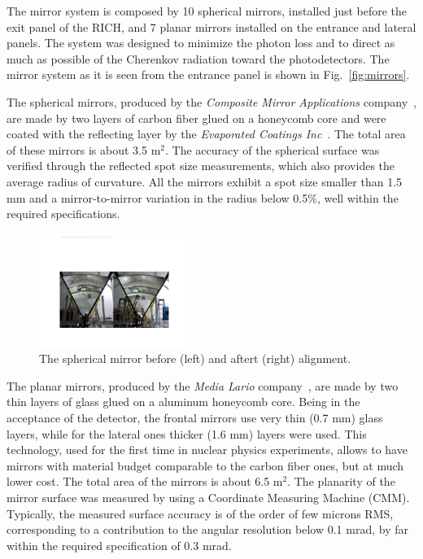 \documentclass[final,5p,times,twocolumn]{elsarticle}
\begin{document}
The mirror system is composed by 10 spherical mirrors, installed just before the exit panel of the RICH, and 7 planar mirrors installed 
on the entrance and lateral panels. The system was designed to minimize the photon loss and to direct as much as possible of the Cherenkov 
radiation toward the photodetectors. The mirror system as it is seen from the entrance panel is shown in Fig.~\ref{fig:mirrors}.

The spherical mirrors, produced by the {\it Composite Mirror Applications} company~\cite{REF:CMA}, are made by two layers of carbon fiber 
glued on a honeycomb core and were coated with the reflecting layer by the {\it Evaporated Coatings Inc}~\cite{REF:ECI}. The total area of 
these mirrors is about 3.5 m$^2$. The accuracy of the spherical surface was verified through the reflected spot size measurements, which 
also provides the average radius of curvature. All the mirrors exhibit a spot size smaller than 1.5 mm and a mirror-to-mirror variation in 
the radius below 0.5\%, well within the required specifications.

\begin{figure}
\begin{center}
\includegraphics[width=0.44\textwidth]{EPS/Sphere_Align.pdf}
\caption{The spherical mirror before (left) and aftert (right) alignment.}
\label{fig:MirAlign}
\end{center}
\end{figure}

The planar mirrors, produced by the {\it Media Lario} company~\cite{REF:MediaLario}, are made by two thin layers of glass glued on a aluminum 
honeycomb core. Being in the acceptance of the detector, the frontal mirrors use very thin (0.7 mm) glass layers, while for the lateral ones 
thicker (1.6 mm) layers were used. This technology, used for the first time in nuclear physics experiments, allows to have mirrors with 
material budget comparable to the carbon fiber ones, but at much lower cost. The total area of the mirrors is about 6.5 m$^2$. The planarity 
of the mirror surface was measured by using a Coordinate Measuring Machine (CMM). Typically, the measured surface accuracy is of the order of few 
microns RMS, corresponding to a contribution to the angular resolution below 0.1 mrad, by far within the required specification of 0.3 mrad.
\end{document}
